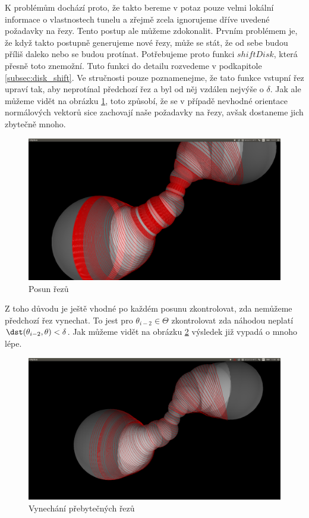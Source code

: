 K problémům dochází proto, že takto bereme v potaz pouze velmi lokální informace o vlastnostech
tunelu a zřejmě zcela ignorujeme dříve uvedené požadavky na řezy. Tento postup ale
můžeme zdokonalit. Prvním problémem je, že když takto postupně generujeme nové řezy,
může se stát, že od sebe budou příliš daleko nebo se budou protínat. Potřebujeme proto
funkci $ shiftDisk $, která přesně toto znemožní. Tuto funkci do detailu rozvedeme v
podkapitole \ref{subsec:disk_shift}. Ve stručnosti pouze poznamenejme, že tato funkce
vstupní řez upraví tak, aby neprotínal předchozí řez a byl od něj vzdálen nejvýše
o $ \delta $. Jak ale můžeme vidět na obrázku \ref{fig:shift_cuts}, toto způsobí,
že se v případě nevhodné orientace normálových vektorů sice zachovají naše
požadavky na řezy, avšak dostaneme jich zbytečně mnoho.

\begin{figure}
    \centering
    \includegraphics[width=\textwidth]{img/shift_cuts.png}
    \caption{Posun řezů}
  \centering
  \label{fig:shift_cuts}
\end{figure}

Z toho důvodu je ještě vhodné po každém posunu zkontrolovat, zda nemůžeme předchozí
řez vynechat. To jest pro $ \theta_{i - 2} \in \Theta $ zkontrolovat zda
náhodou neplatí $ \dst(\theta_{i - 2}, \theta) < \delta $. Jak můžeme vidět na
obrázku \ref{fig:cuts_with_replace} výsledek již vypadá o mnoho lépe.

\begin{figure}
    \centering
    \includegraphics[width=\textwidth]{img/cuts_with_replace.png}
    \caption{Vynechání přebytečných řezů}
  \centering
  \label{fig:cuts_with_replace}
\end{figure}

